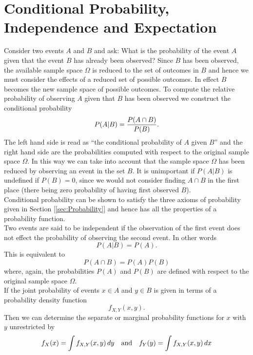 \section{Conditional Probability, Independence and Expectation}
\label{sec:Conditioning}
Consider two events $A$ and $B$ and ask: What is the probability of the event $A$ given that the event $B$ has already been observed? Since $B$ has been observed, the available sample space $\Omega$ is reduced to the set of outcomes in $B$ and hence we must consider the effects of a reduced set of possible outcomes. In effect $B$ becomes the new sample space of possible outcomes. To compute the relative probability of observing $A$ given that $B$ has been observed we construct the conditional probability $$P(A|B) = {P(A\cap B)\over P(B)}.$$ The left hand side is read as ``the conditional probability of $A$ given $B$'' and the right hand side are the probabilities computed with respect to the original sample space $\Omega$. In this way we can take into account that the sample space $\Omega$ has been reduced by observing an event in the set $B$. It is unimportant if $P(A|B)$ is undefined if $P(B)=0$, since we would not consider finding $A\cap B$ in the first place (there being zero probability of having first observed $B$).\\

Conditional probability can be shown to satisfy the three axioms of probability given in Section [\ref{sec:Probability}] and hence has all the properties of a probability function. \\

Two events are said to be {\elevenit independent} if the observation of the first event does not effect the probability of observing the second event. In other words $$P(A|B) = P(A).$$ This is equivalent to $$P(A\cap B) = P(A) P(B)$$ where, again, the probabilities $P(A)$ and $P(B)$ are defined with respect to the original sample space $\Omega$.\\

If the joint probability of events $x\in A$ and $y\in B$ is given in terms of a probability density function $$f_{X,Y}(x,y).$$ Then we can determine the separate or marginal probability functions for $x$ with $y$ unrestricted by $$f_X(x) = \int f_{X,Y}(x,y)\, dy\quad\hbox{and}\quad f_Y(y) = \int f_{X,Y}(x,y)\, dx$$

